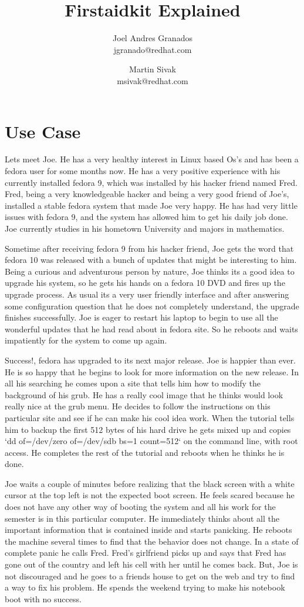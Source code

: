 \documentclass[a4paper,13pt]{article}
\title{Firstaidkit Explained}
\author{Joel Andres Granados \\ jgranado@redhat.com \and Martin Sivak \\ msivak@redhat.com}
\begin{document}
\maketitle

\section{Use Case}
Lets meet Joe.  He has a very healthy interest in Linux based Os's and has been a fedora user for some months now.  He has a very positive experience with his currently installed fedora 9, which was installed by his hacker friend named Fred.  Fred, being a very knowledgeable hacker and being a very good friend of Joe's, installed a stable fedora system that made Joe very happy.  He has had very little issues with fedora 9, and the system has allowed him to get his daily job done.  Joe currently studies in his hometown University and majors in mathematics.

Sometime after receiving fedora 9 from his hacker friend, Joe gets the word that fedora 10 was released with a bunch of updates that might be interesting to him.  Being a curious and adventurous person by nature, Joe thinks its a good idea to upgrade his system, so he gets his hands on a fedora 10 DVD and fires up the upgrade process.  As usual its a very user friendly interface and after answering some configuration question that he does not completely understand, the upgrade finishes successfully.  Joe is eager to restart his laptop to begin to use all the wonderful updates that he had read about in fedora site.  So he reboots and waits impatiently for the system to come up again.

Success!, fedora has upgraded to its next major release.  Joe is happier than ever.  He is so happy that he begins to look for more information on the new release.  In all his searching he comes upon a site that tells him how to modify the background of his grub.  He has a really cool image that he thinks would look really nice at the grub menu.  He decides to follow the instructions on this particular site and see if he can make his cool idea work.  When the tutorial tells him to backup the first 512 bytes of his hard drive he gets mixed up and copies `dd of=/dev/zero of=/dev/sdb bs=1 count=512` on the command line, with root access.  He completes the rest of the tutorial and reboots when he thinks he is done.

Joe waits a couple of minutes before realizing that the black screen with a white cursor at the top left is not the expected boot screen.  He feels scared because he does not have any other way of booting the system and all his work for the semester is in this particular computer.  He immediately thinks about all the important information that is contained inside and starts panicking.  He reboots the machine several times to find that the behavior does not change.  In a state of complete panic he calls Fred.  Fred's girlfriend picks up and says that Fred has gone out of the country and left his cell with her until he comes back.  But, Joe is not discouraged and he goes to a friends house to get on the web and try to find a way to fix his problem.  He spends the weekend trying to make his notebook boot with no success.
\end{document}
